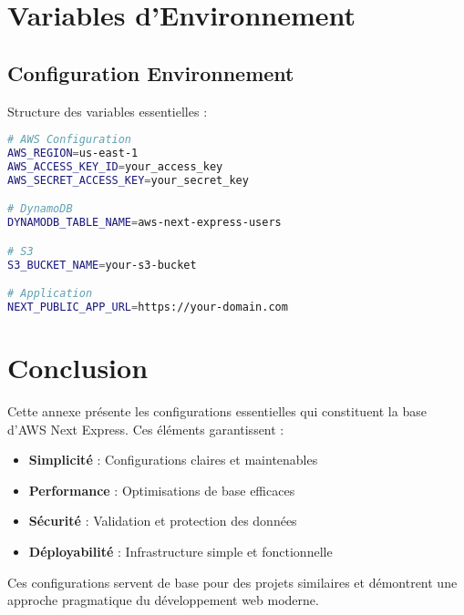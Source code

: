 \section{Variables d'Environnement}

\subsection{Configuration Environnement}

Structure des variables essentielles :

\begin{lstlisting}[language=bash,caption=Variables d'environnement]
# AWS Configuration
AWS_REGION=us-east-1
AWS_ACCESS_KEY_ID=your_access_key
AWS_SECRET_ACCESS_KEY=your_secret_key

# DynamoDB
DYNAMODB_TABLE_NAME=aws-next-express-users

# S3
S3_BUCKET_NAME=your-s3-bucket

# Application
NEXT_PUBLIC_APP_URL=https://your-domain.com
\end{lstlisting}

\section{Conclusion}

Cette annexe présente les configurations essentielles qui constituent la base d'AWS Next Express. Ces éléments garantissent :

\begin{itemize}
    \item \textbf{Simplicité} : Configurations claires et maintenables
    \item \textbf{Performance} : Optimisations de base efficaces
    \item \textbf{Sécurité} : Validation et protection des données
    \item \textbf{Déployabilité} : Infrastructure simple et fonctionnelle
\end{itemize}

Ces configurations servent de base pour des projets similaires et démontrent une approche pragmatique du développement web moderne. 